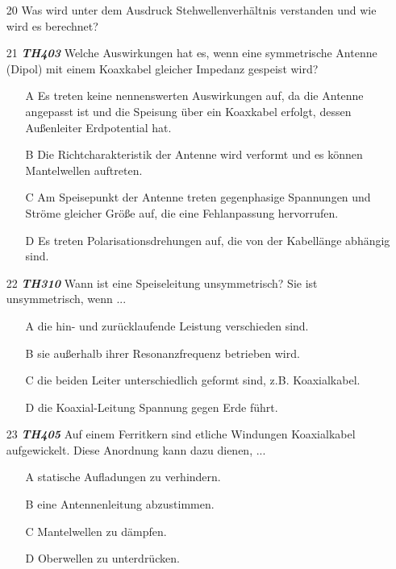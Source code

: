 \begin{enumerate} 
\itemsep1pt\parskip0pt
\item[20] Was wird unter dem Ausdruck Stehwellenverhältnis verstanden und wie wird es berechnet?
\item[21] \emph{\textbf{TH403}}  Welche Auswirkungen hat es, wenn eine symmetrische Antenne (Dipol) mit einem Koaxkabel gleicher Impedanz gespeist wird?
	\begin{enumerate}
	\itemsep1pt\parskip0pt
		\item[A] Es treten keine nennenswerten Auswirkungen auf, da die Antenne angepasst ist und die Speisung über ein Koaxkabel erfolgt, dessen Außenleiter Erdpotential hat.
		\item[B] Die Richtcharakteristik der Antenne wird verformt und es können Mantelwellen auftreten.
		\item[C] Am Speisepunkt der Antenne treten gegenphasige Spannungen und Ströme gleicher Größe auf, die eine Fehlanpassung hervorrufen.
		\item[D] Es treten Polarisationsdrehungen auf, die von der Kabellänge abhängig sind.
	\end{enumerate}
\item[22] \emph{\textbf{TH310}}  Wann ist eine Speiseleitung unsymmetrisch? Sie ist unsymmetrisch, wenn ...
	\begin{enumerate}
	\itemsep1pt\parskip0pt
		\item[A] die hin- und zurücklaufende Leistung verschieden sind.
		\item[B] sie außerhalb ihrer Resonanzfrequenz betrieben wird.
		\item[C] die beiden Leiter unterschiedlich geformt sind, z.B. Koaxialkabel.
		\item[D] die Koaxial-Leitung Spannung gegen Erde führt.
	\end{enumerate}
\item[23] \emph{\textbf{TH405}}  Auf einem Ferritkern sind etliche Windungen Koaxialkabel aufgewickelt. Diese Anordnung kann dazu dienen, ...
	\begin{enumerate}
	\itemsep1pt\parskip0pt
		\item[A] statische Aufladungen zu verhindern.
		\item[B] eine Antennenleitung abzustimmen.
		\item[C] Mantelwellen zu dämpfen.
		\item[D] Oberwellen zu unterdrücken.
	\end{enumerate}
\end{enumerate}

